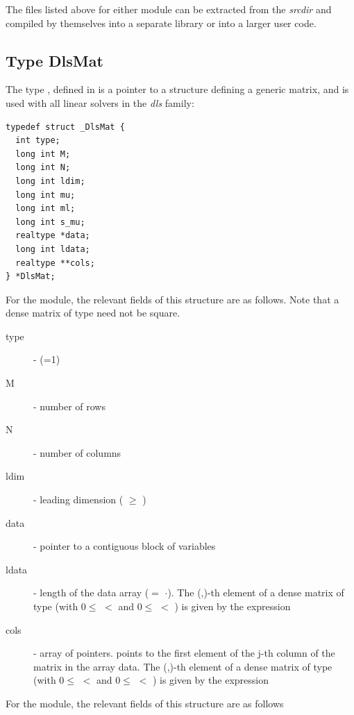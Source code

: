 The files listed above for either module can be extracted  from the {\sundials} 
{\em srcdir} and compiled by themselves into a separate library or into a larger user code.

\subsection{Type DlsMat}
The type , defined in  is a pointer to a 
structure defining a generic matrix, and is used with all linear solvers in 
the {\em dls} family:
\begin{verbatim}
typedef struct _DlsMat {
  int type;
  long int M;
  long int N;
  long int ldim;
  long int mu;
  long int ml;
  long int s_mu;
  realtype *data;
  long int ldata;
  realtype **cols;
} *DlsMat;
\end{verbatim}
For the {\dense} module, the relevant fields of this structure are as follows.
Note that a dense matrix of type  need not be square.
\begin{description}
  \item[type]  -  (=1)
  \item[M]  - number of rows
  \item[N]  - number of columns
  \item[ldim]  - leading dimension ( $\ge$ )
  \item[data]  - pointer to a contiguous block of  variables
  \item[ldata] - length of the data array ($=$ $\cdot$).
    The (,)-th element of a dense matrix  of type 
    (with $0 \le$  $<$  and $ 0 \le$  $<$ ) 
    is given by the expression 
  \item[cols]  - array of pointers.  points to the first element 
    of the j-th column of the matrix in the array data.
    The (,)-th element of a dense matrix  of type 
    (with $0 \le$  $<$  and $ 0 \le$  $<$ ) 
    is given by the expression  
\end{description}
For the {\band} module, the relevant fields of this structure are as follows
